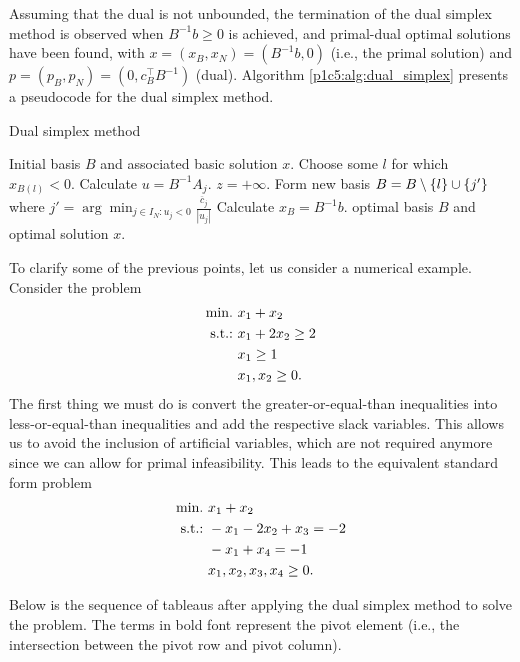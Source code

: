 Assuming that the dual is not unbounded, the termination of the dual simplex method is observed when $B^{-1}b \geq 0$ is achieved, and primal-dual optimal solutions have been found, with $x = (x_B,x_N) = (B^{-1}b, 0)$ (i.e., the primal solution) and $p = (p_B, p_N) = (0, c_B^\top B^{-1})$ (dual). Algorithm \ref{p1c5:alg:dual_simplex} presents a pseudocode for the dual simplex method.

\begin{algorithm}[h]
	\caption{Dual simplex method} \label{p1c5:alg:dual_simplex}
	\begin{algorithmic}[1] %
		 Initial basis $B$ and associated basic solution $x$.
		 \label{alg:opt_condition} 
			\State Choose some $l$ for which $x_{B(l)} < 0$. Calculate $u = B^{-1}A_j$. 
			 \label{alg:unb_condition}
				 $z = +\infty$.		
			\Else
				\State Form new basis $B = B \setminus \left\{ l \right \} \cup \left\{ j' \right \}$ where $j' = \arg\min_{j \in I_N : u_j < 0} \frac{\overline{c}_j}{|u_j|}$ 
				\State Calculate $x_B = B^{-1}b$.
			\EndIf
		\EndWhile
		 optimal basis $B$ and optimal solution $x$.
	\end{algorithmic}
\end{algorithm}

To clarify some of the previous points, let us consider a numerical example. Consider the problem 
%
\begin{align*}
	\mathop{\text{min.~}} &x_1 + x_2 \\
	\mathop{\text{s.t.:~}} &x_1 + 2x_2 \geq 2 \\
	&x_1 \geq  1 \\
	&x_1,x_2 \geq 0.	
\end{align*}	
%
The first thing we must do is convert the greater-or-equal-than inequalities into less-or-equal-than inequalities and add the respective slack variables. This allows us to avoid the inclusion of artificial variables, which are not required anymore since we can allow for primal infeasibility. This leads to the equivalent standard form problem
%
\begin{align*}
	\mathop{\text{min.~}} &x_1 + x_2 \\
	\mathop{\text{s.t.:~}} &-x_1 - 2x_2 + x_3 = -2 \\
	&-x_1 + x_4 = -1 \\
	&x_1,x_2,x_3,x_4 \geq 0.	
\end{align*}

Below is the sequence of tableaus after applying the dual simplex method to solve the problem. The terms in bold font represent the pivot element (i.e., the intersection between the pivot row and pivot column). 


